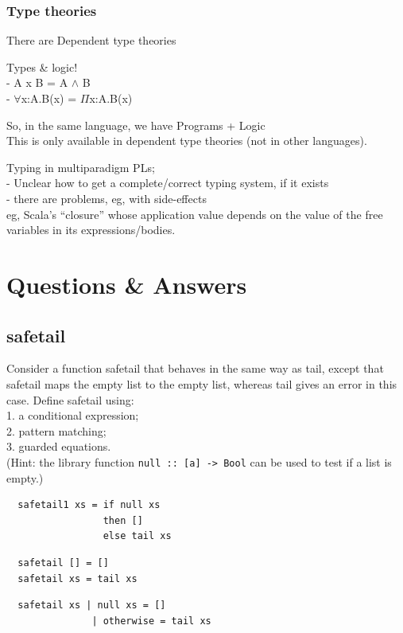 \documentclass[tikz,border=10pt]{project_plan}
\begin{document}
\subsection{Type theories}

There are Dependent type theories

Types \& logic!\\
- A x B = A $\wedge$ B\\
- $\forall$x:A.B(x) = $\Pi$x:A.B(x)

So, in the same language, we have Programs + Logic\\
This is only available in dependent type theories (not in other languages).

Typing in multiparadigm PLs;\\
- Unclear how to get a complete/correct typing system, if it
exists\\
- there are problems, eg, with side-effects\\
eg, Scala’s “closure” whose application value depends on the value of
the free variables in its expressions/bodies.

\chapter{Questions \& Answers}

\section{safetail}

Consider a function safetail that behaves in the same way as tail, except
that safetail maps the empty list to the empty list, whereas tail gives an
error in this case. Define safetail using:\\
1. a conditional expression;\\
2. pattern matching;\\
3. guarded equations.\\
(Hint: the library function \lstinline?null :: [a] -> Bool? can be used to test if a
list is empty.)

\begin{lstlisting}
  safetail1 xs = if null xs
                 then []
                 else tail xs
\end{lstlisting}
\begin{lstlisting}
  safetail [] = []
  safetail xs = tail xs
\end{lstlisting}
\begin{lstlisting}
  safetail xs | null xs = []
               | otherwise = tail xs
\end{lstlisting}
\end{document}
